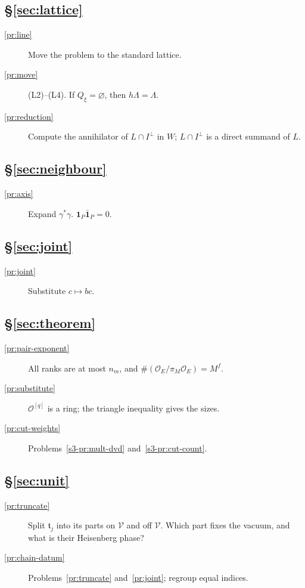 \documentclass[reqno]{amsart}
\theoremstyle{definition}
\theoremstyle{plain}
\newcommand{\Oc}{\mathcal{O}}
\begin{document}
\subsection*{\S\ref{sec:lattice}}
\begin{description}
\item[\ref{pr:line}] Move the problem to the standard lattice.
\item[\ref{pr:move}] (L2)--(L4).  If \(Q_\xi=\varnothing\), then \(h\Lambda=\Lambda\).
\item[\ref{pr:reduction}] Compute the annihilator of \(L\cap I^\perp\) in \(W\); \(L\cap I^\perp\) is a direct summand of \(L\).
\end{description}

\subsection*{\S\ref{sec:neighbour}}
\begin{description}
\item[\ref{pr:axis}] Expand \(\gamma^*\gamma\).  \(\mathbf 1_P\bar{\mathbf 1}_P=0\).
\end{description}

\subsection*{\S\ref{sec:joint}}
\begin{description}
\item[\ref{pr:joint}] Substitute \(c\mapsto bc\).
\end{description}

\subsection*{\S\ref{sec:theorem}}
\begin{description}
\item[\ref{pr:pair-exponent}] All ranks are at most \(n_m\), and \(\#(\Oc_E/\pi_M\Oc_E)=M^f\).
\item[\ref{pr:substitute}] \(\Oc^{[q]}\) is a ring; the triangle inequality gives the sizes.
\item[\ref{pr:cut-weights}] Problems~\ref{s3-pr:mult-dvd} and~\ref{s3-pr:cut-count}.
\end{description}

\subsection*{\S\ref{sec:unit}}
\begin{description}
\item[\ref{pr:truncate}] Split \(\mathfrak t_j\) into its parts on \(\mathcal V\) and off \(\mathcal V\).  Which part fixes the vacuum, and what is their Heisenberg phase?
\item[\ref{pr:chain-datum}] Problems~\ref{pr:truncate} and~\ref{pr:joint}; regroup equal indices.
\end{description}
\end{document}
